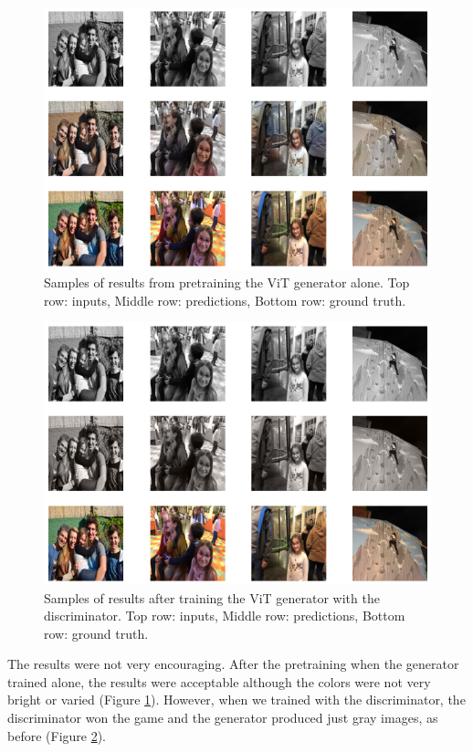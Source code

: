 \documentclass[
]{article}
\begin{document}
\begin{figure}
\centering
\includegraphics{results/Pretrained3channelViT_task_pretraining_result.png}
\caption{Samples of results from pretraining the ViT generator alone.
Top row: inputs, Middle row: predictions, Bottom row: ground truth.}
\label{fig:pretraining-ViT-results}
\end{figure}

\begin{figure}
\centering
\includegraphics{results/Pretrained3channelViT_task_pretraining_FINAL_result.png}
\caption{Samples of results after training the ViT generator with the
discriminator. Top row: inputs, Middle row: predictions, Bottom row:
ground truth.}
\label{fig:ViT-pretrained-results}
\end{figure}

The results were not very encouraging. After the pretraining when the
generator trained alone, the results were acceptable although the colors
were not very bright or varied (Figure \ref{fig:pretraining-ViT-results}). However, when we trained with the
discriminator, the discriminator won the game and the generator produced
just gray images, as before (Figure \ref{fig:ViT-pretrained-results}).
\end{document}

